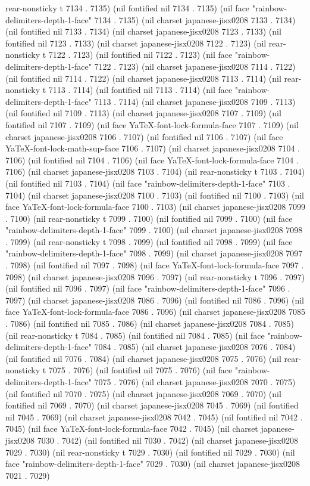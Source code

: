 rear-nonsticky t 7134 . 7135) (nil fontified nil 7134 . 7135) (nil face "rainbow-delimiters-depth-1-face" 7134 . 7135) (nil charset japanese-jisx0208 7133 . 7134) (nil fontified nil 7133 . 7134) (nil charset japanese-jisx0208 7123 . 7133) (nil fontified nil 7123 . 7133) (nil charset japanese-jisx0208 7122 . 7123) (nil rear-nonsticky t 7122 . 7123) (nil fontified nil 7122 . 7123) (nil face "rainbow-delimiters-depth-1-face" 7122 . 7123) (nil charset japanese-jisx0208 7114 . 7122) (nil fontified nil 7114 . 7122) (nil charset japanese-jisx0208 7113 . 7114) (nil rear-nonsticky t 7113 . 7114) (nil fontified nil 7113 . 7114) (nil face "rainbow-delimiters-depth-1-face" 7113 . 7114) (nil charset japanese-jisx0208 7109 . 7113) (nil fontified nil 7109 . 7113) (nil charset japanese-jisx0208 7107 . 7109) (nil fontified nil 7107 . 7109) (nil face YaTeX-font-lock-formula-face 7107 . 7109) (nil charset japanese-jisx0208 7106 . 7107) (nil fontified nil 7106 . 7107) (nil face YaTeX-font-lock-math-sup-face 7106 . 7107) (nil charset japanese-jisx0208 7104 . 7106) (nil fontified nil 7104 . 7106) (nil face YaTeX-font-lock-formula-face 7104 . 7106) (nil charset japanese-jisx0208 7103 . 7104) (nil rear-nonsticky t 7103 . 7104) (nil fontified nil 7103 . 7104) (nil face "rainbow-delimiters-depth-1-face" 7103 . 7104) (nil charset japanese-jisx0208 7100 . 7103) (nil fontified nil 7100 . 7103) (nil face YaTeX-font-lock-formula-face 7100 . 7103) (nil charset japanese-jisx0208 7099 . 7100) (nil rear-nonsticky t 7099 . 7100) (nil fontified nil 7099 . 7100) (nil face "rainbow-delimiters-depth-1-face" 7099 . 7100) (nil charset japanese-jisx0208 7098 . 7099) (nil rear-nonsticky t 7098 . 7099) (nil fontified nil 7098 . 7099) (nil face "rainbow-delimiters-depth-1-face" 7098 . 7099) (nil charset japanese-jisx0208 7097 . 7098) (nil fontified nil 7097 . 7098) (nil face YaTeX-font-lock-formula-face 7097 . 7098) (nil charset japanese-jisx0208 7096 . 7097) (nil rear-nonsticky t 7096 . 7097) (nil fontified nil 7096 . 7097) (nil face "rainbow-delimiters-depth-1-face" 7096 . 7097) (nil charset japanese-jisx0208 7086 . 7096) (nil fontified nil 7086 . 7096) (nil face YaTeX-font-lock-formula-face 7086 . 7096) (nil charset japanese-jisx0208 7085 . 7086) (nil fontified nil 7085 . 7086) (nil charset japanese-jisx0208 7084 . 7085) (nil rear-nonsticky t 7084 . 7085) (nil fontified nil 7084 . 7085) (nil face "rainbow-delimiters-depth-1-face" 7084 . 7085) (nil charset japanese-jisx0208 7076 . 7084) (nil fontified nil 7076 . 7084) (nil charset japanese-jisx0208 7075 . 7076) (nil rear-nonsticky t 7075 . 7076) (nil fontified nil 7075 . 7076) (nil face "rainbow-delimiters-depth-1-face" 7075 . 7076) (nil charset japanese-jisx0208 7070 . 7075) (nil fontified nil 7070 . 7075) (nil charset japanese-jisx0208 7069 . 7070) (nil fontified nil 7069 . 7070) (nil charset japanese-jisx0208 7045 . 7069) (nil fontified nil 7045 . 7069) (nil charset japanese-jisx0208 7042 . 7045) (nil fontified nil 7042 . 7045) (nil face YaTeX-font-lock-formula-face 7042 . 7045) (nil charset japanese-jisx0208 7030 . 7042) (nil fontified nil 7030 . 7042) (nil charset japanese-jisx0208 7029 . 7030) (nil rear-nonsticky t 7029 . 7030) (nil fontified nil 7029 . 7030) (nil face "rainbow-delimiters-depth-1-face" 7029 . 7030) (nil charset japanese-jisx0208 7021 . 7029) 